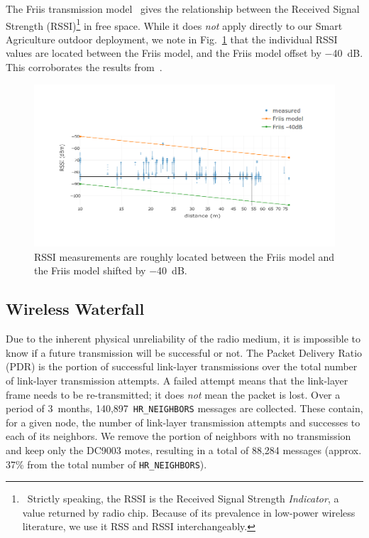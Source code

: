 \documentclass{sig-alternate}
\newcommand{\HRNEIGHBORS}         {{\tt HR\_NEIGHBORS}\xspace}
\newcommand{\NUMHRNEIGHBORS}      {140,897\xspace}
\begin{document}
The Friis transmission model~\cite{saunders07antennas} gives the relationship between the Received Signal Strength (RSSI)\footnote{~Strictly speaking, the RSSI is the Received Signal Strength \textit{Indicator}, a value returned by radio chip. Because of its prevalence in low-power wireless literature, we use it RSS and RSSI interchangeably.} in free space.
While it does \textit{not} apply directly to our Smart Agriculture outdoor deployment, we note in Fig.~\ref{fig:pister_hack} that the individual RSSI values are located between the Friis model, and the Friis model offset by $-$40~dB.
This corroborates the results from~\cite{zats10wireless}.

\begin{figure}[h]
    \centering
    \includegraphics[width=\columnwidth]{pister_hack}
    \caption{RSSI measurements are roughly located between the Friis model and the Friis model shifted by $-$40~dB.}
    \label{fig:pister_hack}
\end{figure}

\subsection{Wireless Waterfall}
\label{sec:waterfall}


Due to the inherent physical unreliability of the radio medium, it is impossible to know if a future transmission will be successful or not.
The Packet Delivery Ratio (PDR) is the portion of successful link-layer transmissions over the total number of link-layer transmission attempts.
A failed attempt means that the link-layer frame needs to be re-transmitted; it does \textit{not} mean the packet is lost.
Over a period of 3~months, \NUMHRNEIGHBORS~\HRNEIGHBORS messages are collected.
These contain, for a given node, the number of link-layer transmission attempts and successes to each of its neighbors.
We remove the portion of neighbors with no transmission and keep only the DC9003 motes, resulting in a total of 88,284 messages (approx. 37\% from the total number of \HRNEIGHBORS).
\end{document}
